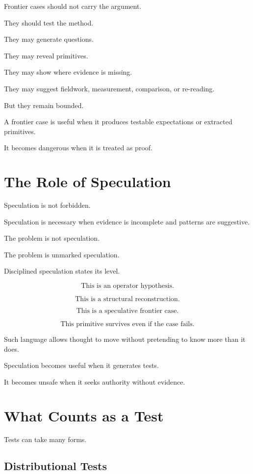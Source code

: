 \documentclass[11pt]{book}
\begin{document}
Frontier cases should not carry the argument.

They should test the method.

They may generate questions.

They may reveal primitives.

They may show where evidence is missing.

They may suggest fieldwork, measurement, comparison, or re-reading.

But they remain bounded.

A frontier case is useful when it produces testable expectations or extracted primitives.

It becomes dangerous when it is treated as proof.

\section{The Role of Speculation}

Speculation is not forbidden.

Speculation is necessary when evidence is incomplete and patterns are suggestive.

The problem is not speculation.

The problem is unmarked speculation.

Disciplined speculation states its level.

\[
\text{This is an operator hypothesis.}
\]

\[
\text{This is a structural reconstruction.}
\]

\[
\text{This is a speculative frontier case.}
\]

\[
\text{This primitive survives even if the case fails.}
\]

Such language allows thought to move without pretending to know more than it does.

Speculation becomes useful when it generates tests.

It becomes unsafe when it seeks authority without evidence.

\section{What Counts as a Test}

Tests can take many forms.

\subsection{Distributional Tests}
\end{document}

